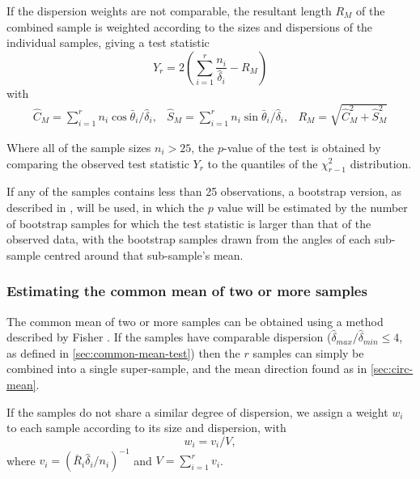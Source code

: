 \documentclass[../../ArchStats.tex]{subfiles}
\begin{document}
If the dispersion weights are not comparable, the resultant length $R_M$ of the combined sample is weighted according to the sizes and dispersions of the individual samples, giving a test statistic
\[Y_r = 2\left(\sum_{i=1}^r \frac{n_i}{\hat{\delta}_i} - R_M\right)\]
with 
\[\begin{matrix*}
\hat{C}_M = \sum_{i=1}^r n_i \cos \bar{\theta}_i / \hat{\delta}_i, &
\hat{S}_M = \sum_{i=1}^r n_i \sin \bar{\theta}_i / \hat{\delta}_i, &
R_M = \sqrt{\hat{C}_M^2 + \hat{S}_M^2}
\end{matrix*}\]

Where all of the sample sizes $n_i > 25$, the $p$-value of the test is obtained by comparing the observed test statistic $Y_r$ to the quantiles of the $\chi^2_{r-1}$ distribution. 

If any of the samples contains less than 25 observations, a bootstrap version, as described in \cite[section 8.4.4]{Fisher1993}, will be used, in which the $p$ value will be estimated by the number of bootstrap samples for which the test statistic is larger than that of the observed data, with the bootstrap samples drawn from the angles of each sub-sample centred around that sub-sample's mean. 


\subsubsection{Estimating the common mean of two or more samples}

The common mean of two or more samples can be obtained using a method described by Fisher \cite[section5.3.5]{Fisher1993}. If the samples have comparable dispersion ($\hat{\delta}_{max} / \hat{\delta}_{min} \leq 4$, as defined in \ref{sec:common-mean-test}) then the $r$ samples can simply be combined into a single super-sample, and the mean direction found as in \ref{sec:circ-mean}.

If the samples do not share a similar degree of dispersion, we assign a weight $w_i$ to each sample according to its size and dispersion, with
\[w_i = v_i/V,\]
where $v_i = (\bar{R}_i \hat{\delta}_i / n_i)^{-1}$ and $V = \sum_{i=1}^r v_i$.
\end{document}
